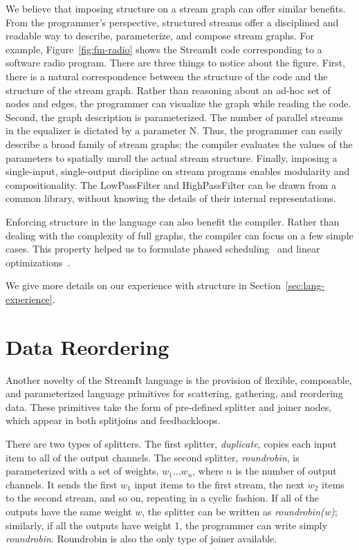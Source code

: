 We believe that imposing structure on a stream graph can offer similar
benefits.  From the programmer's perspective, structured streams offer
a disciplined and readable way to describe, parameterize, and compose
stream graphs.  For example, Figure~\ref{fig:fm-radio} shows the
StreamIt code corresponding to a software radio program.  There are
three things to notice about the figure.  First, there is a natural
correspondence between the structure of the code and the structure of
the stream graph.  Rather than reasoning about an ad-hoc set of nodes
and edges, the programmer can visualize the graph while reading the
code.  Second, the graph description is parameterized.  The number of
parallel streams in the equalizer is dictated by a parameter N.  Thus,
the programmer can easily describe a broad family of stream graphs;
the compiler evaluates the values of the parameters to spatially
unroll the actual stream structure.  Finally, imposing a single-input,
single-output discipline on stream programs enables modularity and
compositionality.  The LowPassFilter and HighPassFilter can be drawn
from a common library, without knowing the details of their internal
representations.

Enforcing structure in the language can also benefit the compiler.
Rather than dealing with the complexity of full graphs, the compiler
can focus on a few simple cases.  This property helped us to formulate
phased scheduling~\cite{karczmarek:lctes:2003,karczmarek-thesis} and
linear
optimizations~\cite{lamb:pldi:2003,lamb-thesis,agrawal:cases:2005,agrawal-thesis}.

We give more details on our experience with structure in Section~\ref{sec:lang-experience}.

\section{Data Reordering}

Another novelty of the StreamIt language is the provision of flexible,
composable, and parameterized language primitives for scattering,
gathering, and reordering data.  These primitives take the form of
pre-defined splitter and joiner nodes, which appear in both splitjoins
and feedbackloops.

There are two types of splitters.  The first splitter, {\it
  duplicate}, copies each input item to all of the output channels.
The second splitter, {\it roundrobin}, is parameterized with a set of
weights, $w_1 \dots w_n$, where $n$ is the number of output channels.
It sends the first $w_1$ input items to the first stream, the next
$w_2$ items to the second stream, and so on, repeating in a cyclic
fashion.  If all of the outputs have the same weight $w$, the splitter
can be written as {\it roundrobin(w)}; similarly, if all the outputs
have weight 1, the programmer can write simply {\it roundrobin}.
Roundrobin is also the only type of joiner available.

